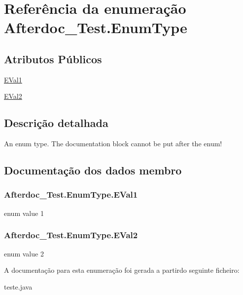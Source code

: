 \hypertarget{enumAfterdoc__Test_1_1EnumType}{}\section{Referência da enumeração Afterdoc\+\_\+\+Test.\+Enum\+Type}
\label{enumAfterdoc__Test_1_1EnumType}
\subsection*{Atributos Públicos}
\begin{DoxyCompactItemize}
\item 
\hyperlink{enumAfterdoc__Test_1_1EnumType_a2af99ef4af668245da270471beabf139}{E\+Val1}
\item 
\hyperlink{enumAfterdoc__Test_1_1EnumType_aeccfd482e6934b876a4363e7ab4a39ba}{E\+Val2}
\end{DoxyCompactItemize}


\subsection{Descrição detalhada}
An enum type. The documentation block cannot be put after the enum! 

\subsection{Documentação dos dados membro}
\subsubsection[{\texorpdfstring{E\+Val1}{EVal1}}]{\setlength{\rightskip}{0pt plus 5cm}Afterdoc\+\_\+\+Test.\+Enum\+Type.\+E\+Val1}\hypertarget{enumAfterdoc__Test_1_1EnumType_a2af99ef4af668245da270471beabf139}{}\label{enumAfterdoc__Test_1_1EnumType_a2af99ef4af668245da270471beabf139}
enum value 1 
\subsubsection[{\texorpdfstring{E\+Val2}{EVal2}}]{\setlength{\rightskip}{0pt plus 5cm}Afterdoc\+\_\+\+Test.\+Enum\+Type.\+E\+Val2}\hypertarget{enumAfterdoc__Test_1_1EnumType_aeccfd482e6934b876a4363e7ab4a39ba}{}\label{enumAfterdoc__Test_1_1EnumType_aeccfd482e6934b876a4363e7ab4a39ba}
enum value 2 

A documentação para esta enumeração foi gerada a partirdo seguinte ficheiro\+:\begin{DoxyCompactItemize}
\item 
teste.\+java\end{DoxyCompactItemize}
